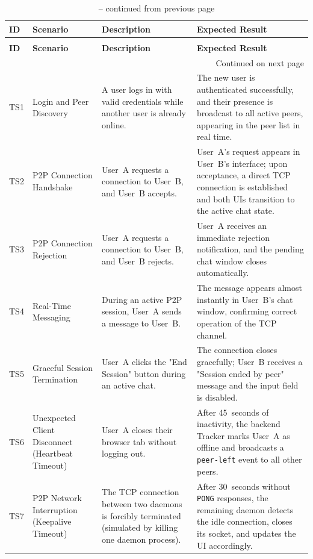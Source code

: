 \begin{longtable}{|p{0.8cm}|p{2.4cm}|p{4cm}|p{6.4cm}|}

\caption{Primary system test scenarios.}
\label{tab:test-scenarios} \\

\hline
\textbf{ID} & \textbf{Scenario} & \textbf{Description} & \textbf{Expected Result} \\ 
\hline
\endfirsthead

\caption[]{-- continued from previous page} \\
\hline
\textbf{ID} & \textbf{Scenario} & \textbf{Description} & \textbf{Expected Result} \\ 
\hline
\endhead

\hline 
\multicolumn{4}{r}{{Continued on next page}} \\ 
\endfoot

\hline
\endlastfoot

TS1 & Login and Peer Discovery & A user logs in with valid credentials while another user is already online. & The new user is authenticated successfully, and their presence is broadcast to all active peers, appearing in the peer list in real time. \\ 
\hline
TS2 & P2P Connection Handshake & User~A requests a connection to User~B, and User~B accepts. & User~A’s request appears in User~B’s interface; upon acceptance, a direct TCP connection is established and both UIs transition to the active chat state. \\ 
\hline
TS3 & P2P Connection Rejection & User~A requests a connection to User~B, and User~B rejects. & User~A receives an immediate rejection notification, and the pending chat window closes automatically. \\ 
\hline
TS4 & Real-Time Messaging & During an active P2P session, User~A sends a message to User~B. & The message appears almost instantly in User~B’s chat window, confirming correct operation of the TCP channel. \\ 
\hline
TS5 & Graceful Session Termination & User~A clicks the "End Session" button during an active chat. & The connection closes gracefully; User~B receives a "Session ended by peer" message and the input field is disabled. \\ 
\hline
TS6 & Unexpected Client Disconnect (Heartbeat Timeout) & User~A closes their browser tab without logging out. & After 45~seconds of inactivity, the backend Tracker marks User~A as offline and broadcasts a \texttt{peer-left} event to all other peers. \\ 
\hline
TS7 & P2P Network Interruption (Keepalive Timeout) & The TCP connection between two daemons is forcibly terminated (simulated by killing one daemon process). & After 30~seconds without \texttt{PONG} responses, the remaining daemon detects the idle connection, closes its socket, and updates the UI accordingly. \\ 

\end{longtable}

